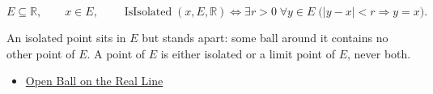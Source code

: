 \begin{remark*}
\[
E\subseteq\mathbb{R},\qquad x\in E,\qquad
\operatorname{IsIsolated}(x,E,\mathbb{R})
\Longleftrightarrow
\exists r>0\;\forall y\in E\;\bigl(|y-x|<r \Longrightarrow y=x\bigr).
\]
\end{remark*}
\begin{remark*}[Interpretation]
An isolated point sits in $E$ but stands apart: some ball around it contains no other point of $E$. A point of $E$ is either isolated or a limit point of $E$, never both.
\end{remark*}
\begin{dependencies}
\begin{itemize}
  \item \hyperref[def:open-ball]{Open Ball on the Real Line}
\end{itemize}
\end{dependencies}
